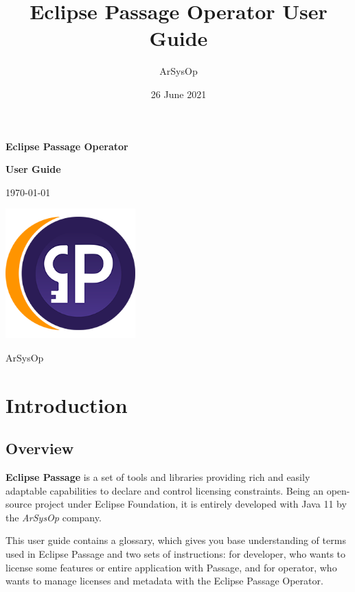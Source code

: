 \documentclass[12pt]{report}
\title{Eclipse Passage Operator User Guide}
\author{ArSysOp}
\date{26 June 2021}
\begin{document}
\begin{titlepage}
    \begin{center}
        \vspace*{1cm}

        \Huge \textbf{Eclipse Passage Operator}
        
        \Huge  \textbf{User Guide}

        \vspace{0.5cm}

        \Large  \today

        \vfill

        \includegraphics[width=5cm]{passage}

        \vfill

        \Large
        ArSysOp
    \end{center}
\end{titlepage}

\tableofcontents
{}

\chapter*{Introduction}

\section*{Overview}

\textbf{Eclipse Passage} is a set of tools and libraries providing rich and easily adaptable capabilities to declare and control licensing constraints.
Being an open-source project under Eclipse Foundation, it is entirely developed with Java 11 by the \textit{ArSysOp} company.

This user guide contains a glossary, which gives you base understanding of terms used in Eclipse Passage and two sets of instructions: for developer, who
wants to license some features or entire application with Passage, and for operator, who wants to manage licenses and metadata with the Eclipse Passage Operator.
\end{document}
